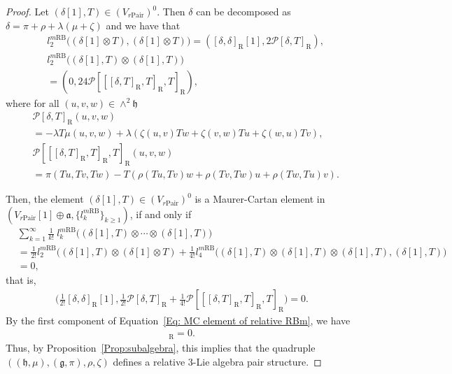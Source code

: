 \documentclass[12pt]{amsart}
\theoremstyle{definition}
\begin{document}
\begin{proof}
	Let $(\delta[1], T)\in (V_{r\mathrm{Pair}})^0$. Then $\delta$ can be decomposed
	as $\delta=\pi+\rho+\lambda(\mu+\zeta) $ and we have that
	\begin{align*}
		&	l^{m\mathrm{RB}}_2\big( (\delta[1]\otimes T), (\delta [1]\otimes T)  \big) =\left( [\delta, \delta ]_{\mathrm{R}} [1], 2\mathcal{P}[\delta,T]_{\mathrm{R}} \right) ,\\
		&	l^{m\mathrm{RB}}_2\big( (\delta[1],T)\otimes (\delta [1], T)  \big)\\
		&=\left(0, 24\mathcal{P}[[[\delta,T]_{\mathrm{R}},T]_{\mathrm{R}},T]_{\mathrm{R}}\right),
	\end{align*}
	where for all $(u,v,w)\in \wedge^2 \mathfrak{h}$
	\begin{align*}
		&\mathcal{P}[\delta,T]_{\mathrm{R}} (u,v,w)\\
		&	=-\lambda T\mu(u,v,w)+\lambda\left( \zeta(u,v)Tw+\zeta(v,w)Tu+\zeta(w,u)Tv\right) , \\
		& \mathcal{P}[[[\delta,T]_{\mathrm{R}},T]_{\mathrm{R}},T]_{\mathrm{R}}(u,v,w)\\
		&=  \pi(Tu,Tv,Tw)-T\left( \rho(Tu,Tv)w+\rho(Tv,Tw)u+\rho(Tw,Tu)v\right).
	\end{align*}
	
	Then, the element $(\delta[1], T)\in (V_{r\mathrm{Pair}})^0$ is  a  Maurer-Cartan element in  $(V_{r\mathrm{Pair}}[1] \oplus \mathfrak{a}, \{l^{m\mathrm{RB}}_k\}_{k\geq 1} )$, if and only if
	\begin{align*}
		& \sum_{k=1}^\infty \frac{1}{k !} ~\! l^{m\mathrm{RB}}_k \Big((\delta[1], T)\otimes \cdots\otimes(\delta[1], T)\Big)\\
		&=\frac{1}{2!}l^{m\mathrm{RB}}_2\big( (\delta[1], T)\otimes (\delta [1]\otimes T)+\frac{1}{4!}	l^{m\mathrm{RB}}_4\big( (\delta[1], T)\otimes (\delta [1], T)\otimes(\delta [1], T), (\delta [1], T) \big)\\
		&=0,
	\end{align*}
	that is,
	\begin{align}\label{Eq: MC element of relative RBm}
		\Big(\frac{1}{2!} [\delta, \delta ]_{\mathrm{R}}[1] ,\frac{1}{2!}\mathcal{P}[\delta,T]_{\mathrm{R}}+ \frac{1}{4!} \mathcal{P}[[[\delta,T]_{\mathrm{R}},T]_{\mathrm{R}},T]_{\mathrm{R}}\Big) =0.
	\end{align}
	By the first component of Equation~\ref{Eq: MC element of relative RBm}, we have
	\begin{align*}
		[\delta, \delta ]_{\mathrm{R}}=0.
	\end{align*}
	Thus, by Proposition~\ref{Prop:subalgebra}, this implies that the quadruple $\left( \left(\mathfrak{h},\mu\right),\left(\mathfrak{g},\pi\right),\rho,\zeta \right) $ defines a relative $3$-Lie algebra pair  structure.
	

\end{proof}
\end{document}
